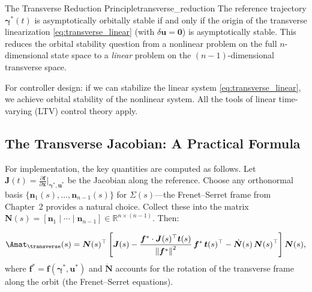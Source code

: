 \documentclass[12pt, openany]{book}
\theoremstyle{plain}
\newcommand{\state}{\bm{x}}
\newcommand{\control}{\bm{u}}
\newcommand{\traj}{\bm{\gamma}}
\newcommand{\Reals}{\mathbb{R}}
\newcommand{\norm}[1]{\left\lVert #1 \right\rVert}
\begin{document}
\begin{principle}{The Transverse Reduction Principle}{transverse_reduction}
  The reference trajectory $\traj^*(t)$ is asymptotically orbitally stable
  if and only if the origin of the transverse linearization
  \eqref{eq:transverse_linear} (with $\delta\control = \bm{0}$) is
  asymptotically stable. This reduces the orbital stability question from
  a nonlinear problem on the full $n$-dimensional state space to a
  \emph{linear} problem on the $(n{-}1)$-dimensional transverse space.

  For controller design: if we can stabilize the linear system
  \eqref{eq:transverse_linear}, we achieve orbital stability of the
  nonlinear system. All the tools of linear time-varying (LTV) control
  theory apply.
\end{principle}

\subsection{The Transverse Jacobian: A Practical Formula}

For implementation, the key quantities are computed as follows. Let
$\bm{J}(t) = \frac{\partial \bm{f}}{\partial \state}\big|_{\traj^*, \control^*}$
be the Jacobian along the reference. Choose any orthonormal basis
$\{\bm{n}_1(s), \ldots, \bm{n}_{n-1}(s)\}$ for $\Sigma(s)$---the Frenet--Serret
frame from Chapter~2 provides a natural choice. Collect these into the matrix
$\bm{N}(s) = [\bm{n}_1 \mid \cdots \mid \bm{n}_{n-1}] \in \Reals^{n \times (n-1)}$.
Then:

\begin{equation}\label{eq:transverse_practical}
  \Amat_\transverse(s) = \bm{N}(s)^\top \left[\bm{J}(s)
  - \frac{\bm{f}^* \cdot \bm{J}(s)^\top \bm{t}(s)}{\norm{\bm{f}^*}^2}\, \bm{f}^*\, \bm{t}(s)^\top
  - \dot{\bm{N}}(s)\, \bm{N}(s)^\top \right] \bm{N}(s),
\end{equation}
where $\bm{f}^* = \bm{f}(\traj^*, \control^*)$ and $\dot{\bm{N}}$ accounts
for the rotation of the transverse frame along the orbit (the Frenet--Serret
equations).
\end{document}
